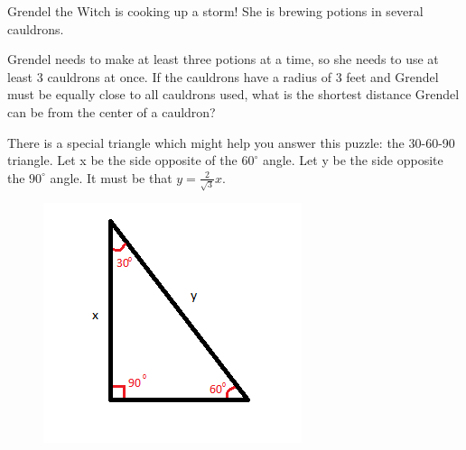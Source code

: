 


Grendel the Witch is cooking up a storm! She is brewing potions in several cauldrons.

Grendel needs to make at least three potions at a time, so she needs to use at least 3 cauldrons at once. If the cauldrons have a radius of 3 feet and Grendel must be equally close to all cauldrons used, what is the shortest distance Grendel can be from the center of a cauldron?

There is a special triangle which might help you answer this puzzle: the 30-60-90 triangle. Let x be the side opposite of the $60^\circ$ angle. Let y be the side opposite the $90^\circ$ angle. It must be that $y = \frac{2}{\sqrt{3}}x$.

\begin{figure}[h!]
\centering
\includegraphics[scale=1]{assets/josh/triangle}
\end{figure}
